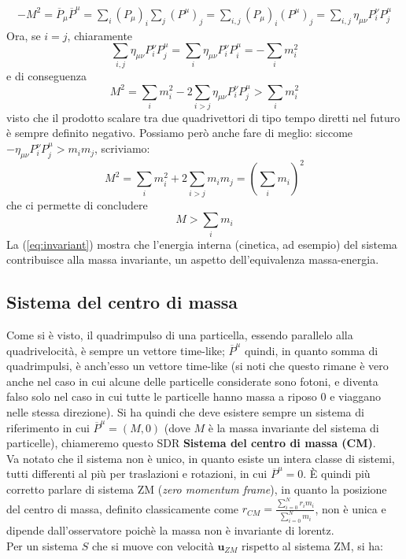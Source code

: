 \documentclass[a4paper,11pt]{book}
\theoremstyle{plain}
\theoremstyle{definition}
\begin{document}
\begin{align*}
-M^2=\overline{P}_{\mu}\overline{P}^{\mu}=\sum_i (P_{\mu})_i \sum_j (P^{\mu})_j=\sum_{i,j}(P_{\mu})_i(P^{\mu})_j=\sum_{i,j}\eta_{\mu\nu}P^{\nu}_iP^{\mu}_j
\end{align*}
Ora, se $i=j$, chiaramente 
\[
\sum_{i,j}\eta_{\mu\nu}P^{\nu}_iP^{\mu}_j=\sum_i \eta_{\mu\nu}P^{\nu}_iP^{\mu}_i=-\sum_i m_i^2
\]
e di conseguenza
\[
M^2 = \sum_i m_i^2 -2\sum_{i>j}\eta_{\mu\nu}P^{\nu}_iP^{\mu}_j>\sum_i m_i^2
\]
visto che il prodotto scalare tra due quadrivettori di tipo tempo diretti nel futuro è sempre definito negativo. Possiamo però anche fare di meglio: siccome $-\eta_{\mu\nu}P^{\nu}_iP^{\mu}_j > m_im_j$, scriviamo:
\[
M^2=\sum_i m_i^2 + 2\sum_{i>j}m_im_j = (\sum_i m_i)^2
\]
che ci permette di concludere
\begin{equation}\label{eq:invariant}
M>\sum_i m_i
\end{equation}
La (\ref{eq:invariant}) mostra che l'energia interna (cinetica, ad esempio) del sistema contribuisce alla massa invariante, un aspetto dell'equivalenza massa-energia. 

\subsection{Sistema del centro di massa}
Come si è visto, il quadrimpulso di una particella, essendo parallelo alla quadrivelocità, è sempre un vettore time-like; $\overline{P}^{\mu}$ quindi, in quanto somma di quadrimpulsi, è anch'esso un vettore time-like (si noti che questo rimane è vero anche nel caso in cui alcune delle particelle considerate sono fotoni, e diventa falso solo nel caso in cui tutte le particelle hanno massa a riposo $0$ e viaggano nelle stessa direzione). Si ha quindi che deve esistere sempre un sistema di riferimento in cui $\overline{P}^{\mu} = (M,0)$ (dove $M$ è la massa invariante del sistema di particelle), chiameremo questo SDR \textbf{Sistema del centro di massa (CM)}. \\
Va notato che il sistema non è unico, in quanto esiste un intera classe di sistemi, tutti differenti al più per traslazioni e rotazioni, in cui $\overline{P}^{\mu} = 0$. È quindi più corretto parlare di sistema ZM (\textit{zero momentum frame}), in quanto la posizione del centro di massa, definito classicamente come $r_{CM} = \frac {\sum_{i=0}^N r_i m_i}{\sum_{i=0}^N m_i}$, non è unica e dipende dall'osservatore poichè la massa non è invariante di lorentz.\\
Per un sistema $S$ che si muove con velocità $\textbf{u}_{ZM}$ rispetto al sistema ZM, si ha:
\end{document}
